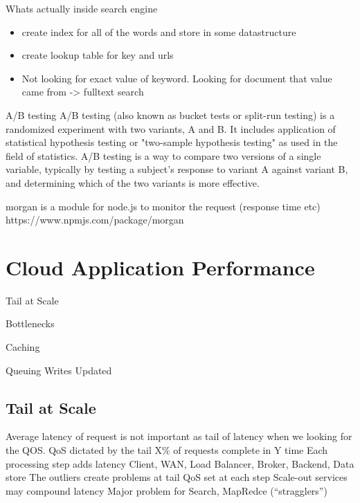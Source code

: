 \documentclass[fancy,11pt,titlestyle=display]{style/elegantbook}
\begin{document}
Whats actually inside search engine
\begin{itemize}
\item create index for all of the words and store in some datastructure
\item create lookup table for key and urls
\item Not looking for exact value of keyword. Looking for document that value came from -> fulltext search 
\end{itemize}

\begin{definition}{A/B testing}{}
A/B testing (also known as bucket tests or split-run testing) is a randomized experiment with two variants, A and B. It includes application of statistical hypothesis testing or "two-sample hypothesis testing" as used in the field of statistics. A/B testing is a way to compare two versions of a single variable, typically by testing a subject's response to variant A against variant B, and determining which of the two variants is more effective.
\end{definition}



\begin{note}
morgan is a module for node.js to monitor the request (response time etc)
https://www.npmjs.com/package/morgan

\end{note}

\chapter{Cloud Application Performance}

\begin{introduction}[Topics]
\item Tail at Scale
\item Bottlenecks 
\item Caching
\item Queuing Writes Updated
\end{introduction}


\section{Tail at Scale}{}

Average latency of request is not important as tail of latency when we looking for the QOS.
QoS dictated by the tail
X\% of requests complete in Y time
Each processing step adds latency
Client, WAN, Load Balancer, Broker, Backend, Data store
The outliers create problems at tail
QoS set at each step
Scale-out services may compound latency
Major problem for Search, MapRedce (``stragglers'')
\end{document}
